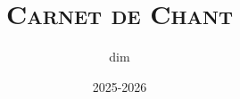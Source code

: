 \usepackage{array}
\usepackage[table]{xcolor}

\usepackage[chorded,noscripture]{songs}
\usepackage{lyluatex}

\usepackage{fontspec}
\usepackage{lilyglyphs}

\indexesoff

\renewcommand{\everychorus}{\textnote{Chorus:}}

\renewcommand{\lyricfont}{\sffamily\small}
\renewcommand{\printchord}[1]{\rmfamily\bf#1}


\title{\Huge \sffamily \scshape Carnet de Chant}
\author{dim}
\date{2025-2026}
